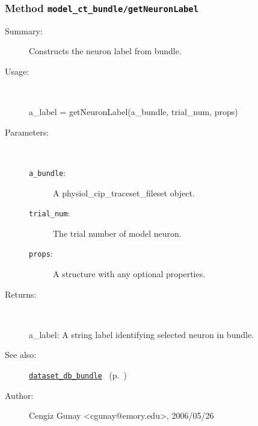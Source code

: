 \subsubsection[Method \texttt{getNeuronLabel}]{Method \texttt{model\_ct\_bundle/getNeuronLabel}}%
%
\label{ref_model_ct_bundle__getNeuronLabel}%
\hypertarget{ref_model_ct_bundle__getNeuronLabel}{}%
\begin{description}
\item[Summary:]Constructs the neuron label from bundle.
%
\item[Usage:]~%
\begin{lyxcode}%
a\_label = getNeuronLabel(a\_bundle, trial\_num, props)
%
\end{lyxcode}%
%
%
\item[Parameters:]~
\begin{description}%
\item[\texttt{a\_bundle}:]
 A physiol\_cip\_traceset\_fileset object.
\item[\texttt{trial\_num}:]
 The trial number of model neuron.
\item[\texttt{props}:]
 A structure with any optional properties.
\end{description}%
%
\item[Returns:
]~

	a\_label: A string label identifying selected neuron in bundle.
%
%
\item[See also:]%
\hyperlink{ref_dataset_db_bundle}{\texttt{dataset\_db\_bundle}}%
\ (p.~\pageref{ref_dataset_db_bundle})%
%
%
\item[Author:]%
Cengiz Gunay <cgunay@emory.edu>, 2006/05/26
%
\end{description}
\methodline%
